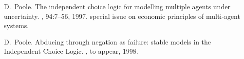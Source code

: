 \documentclass[11pt,fleqn]{article}
\begin{document}
\begin{thebibliography}{1}

D.~Poole.
\newblock The independent choice logic for modelling multiple agents under
  uncertainty.
, 94:7--56, 1997.
\newblock special issue on economic principles of multi-agent systems.

D.~Poole.
\newblock Abducing through negation as failure: stable models in the
  {Independent Choice Logic}.
, to appear, 1998.

\end{thebibliography}

\printindex
\end{document}
